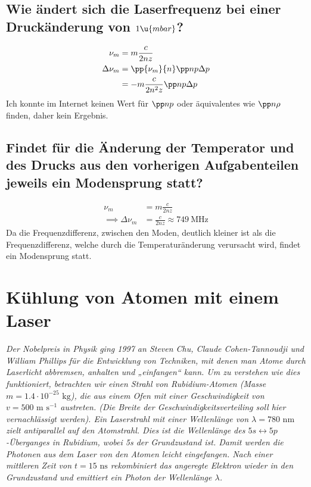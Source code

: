 \documentclass[ex]{exercise_4.1}
\begin{document}
\subsection{Wie ändert sich die Laserfrequenz bei einer Druckänderung von \(1\u{mbar}\)?}

\dottedlinete

\begin{align*}
    \nu_m &= m \frac{c}{2nz}\\
    \Delta \nu_m &= \pp{\nu_m}{n} \pp n p \Delta p \\ 
    &=- m \frac{c}{2n^2z}\pp n p \Delta p 
\end{align*}
Ich konnte im Internet keinen Wert für \(\pp n p \) oder äquivalentes wie \(\pp n \rho \) finden, daher kein Ergebnis.

\subsection{Findet für die Änderung der Temperator und des Drucks aus den vorherigen Aufgabenteilen jeweils ein Modensprung statt?}

\dottedlinete

\begin{align*}
    \nu_m &= m \frac{c}{2nz}\\
    \implies \Delta \nu_m &= \frac{c}{2nz}
    \approx \SI{749}{\mega\hertz}
\end{align*}
Da die Frequenzdifferenz, zwischen den Moden, deutlich kleiner ist als die Frequenzdifferenz, welche durch die Temperaturänderung verursacht wird, findet ein Modensprung statt.

\section{Kühlung von Atomen mit einem Laser}
{\it Der Nobelpreis in Physik ging 1997 an Steven Chu, Claude Cohen-Tannoudji und William Phillips für die Entwicklung von Techniken, mit denen man Atome durch Laserlicht abbremsen, anhalten und „einfangen“ kann. Um zu verstehen wie dies funktioniert, betrachten wir einen Strahl von Rubidium-Atomen (Masse
$m = 1.4 ⋅ 10^{-25} \text{ kg}$), die aus einem Ofen mit einer Geschwindigkeit von $v = 500 \text{ m s}^{-1}$ austreten. (Die Breite
der Geschwindigkeitsverteiling soll hier vernachlässigt werden). Ein Laserstrahl mit einer Wellenlänge von
$\lambda = 780 \text{ nm}$ zielt antiparallel auf den Atomstrahl. Dies ist die Wellenlänge des $5s \leftrightarrow 5p$-Überganges in
Rubidium, wobei 5s der Grundzustand ist. Damit werden die Photonen aus dem Laser von den Atomen
leicht eingefangen. Nach einer mittleren Zeit von $t = 15 \text{ ns}$ rekombiniert das angeregte Elektron wieder in den
Grundzustand und emittiert ein Photon der Wellenlänge $\lambda$.}
\end{document}
